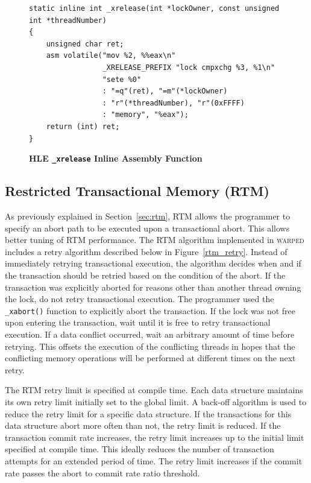 \documentclass[11pt]{book}
\begin{document}
\begin{figure}
\begin{verbatim}
static inline int _xrelease(int *lockOwner, const unsigned int *threadNumber)
{
    unsigned char ret;
    asm volatile("mov %2, %%eax\n"
                 _XRELEASE_PREFIX "lock cmpxchg %3, %1\n"
                 "sete %0"
                 : "=q"(ret), "=m"(*lockOwner)
                 : "r"(*threadNumber), "r"(0xFFFF)
                 : "memory", "%eax");
    return (int) ret;
}
\end{verbatim}
\caption{\textbf{HLE \texttt{\_xrelease} Inline Assembly Function}}\label{hle_inline_xrelease}
\end{figure}

\subsection{Restricted Transactional Memory (RTM)}

As previously explained in Section~\ref{sec:rtm}, RTM allows the programmer to specify an
abort path to be executed upon a transactional abort.  This allows better tuning of RTM
performance.  The RTM algorithm implemented in \textsc{warped} includes a retry algorithm
described below in Figure~\ref{rtm_retry}.  Instead of immediately retrying transactional
execution, the algorithm decides when and if the transaction should be retried based on
the condition of the abort.  If the transaction was explicitly aborted for reasons other
than another thread owning the lock, do not retry transactional execution.  The programmer
used the \texttt{\_xabort()} function to explicitly abort the transaction. If the lock was
not free upon entering the transaction, wait until it is free to retry transactional
execution.  If a data conflict occurred, wait an arbitrary amount of time before retrying.
This offsets the execution of the conflicting threads in hopes that the conflicting memory
operations will be performed at different times on the next retry.

The RTM retry limit is specified at compile time.  Each data structure maintains its own
retry limit initially set to the global limit.  A back-off algorithm is used to reduce the
retry limit for a specific data structure.  If the transactions for this data structure
abort more often than not, the retry limit is reduced.  If the transaction commit rate
increases, the retry limit increases up to the initial limit specified at compile time.
This ideally reduces the number of transaction attempts for an extended period of time.
The retry limit increases if the commit rate passes the abort to commit rate ratio
threshold.
\end{document}
